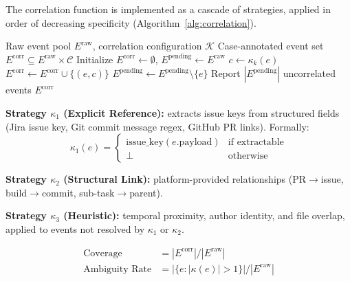 The correlation function is implemented as a cascade of strategies, applied
in order of decreasing specificity (Algorithm~\ref{alg:correlation}).

\begin{algorithm}[htbp]
\caption{Case Correlation Cascade}
\label{alg:correlation}
\begin{algorithmic}[1]
\REQUIRE Raw event pool $E^{\text{raw}}$, correlation configuration $\mathcal{K}$
\ENSURE Case-annotated event set $E^{\text{corr}} \subseteq E^{\text{raw}} \times \mathcal{C}$
\STATE Initialize $E^{\text{corr}} \gets \emptyset$, $E^{\text{pending}} \gets E^{\text{raw}}$
        \STATE $c \gets \kappa_k(e)$
            \STATE $E^{\text{corr}} \gets E^{\text{corr}} \cup \{(e, c)\}$
            \STATE $E^{\text{pending}} \gets E^{\text{pending}} \setminus \{e\}$
        \ENDIF
    \ENDFOR
\ENDFOR
\STATE Report $|E^{\text{pending}}|$ uncorrelated events
\RETURN $E^{\text{corr}}$
\end{algorithmic}
\end{algorithm}

\textbf{Strategy $\kappa_1$ (Explicit Reference):} extracts issue keys from
structured fields (Jira issue key, Git commit message regex, GitHub PR
links). Formally:
\begin{equation}
\label{eq:kappa1}
\kappa_1(e) = \begin{cases}
    \text{issue\_key}(e.\text{payload}) & \text{if extractable} \\
    \bot & \text{otherwise}
\end{cases}
\end{equation}

\textbf{Strategy $\kappa_2$ (Structural Link):} platform-provided
relationships (PR$\to$issue, build$\to$commit, sub-task$\to$parent).

\textbf{Strategy $\kappa_3$ (Heuristic):} temporal proximity, author
identity, and file overlap, applied to events not resolved by $\kappa_1$
or $\kappa_2$.

\begin{definition}
\label{def:corr-quality}
\begin{align}
\text{Coverage}      &= |E^{\text{corr}}| / |E^{\text{raw}}|
    \label{eq:corr-coverage} \\
\text{Ambiguity Rate} &= |\{e : |\kappa(e)| > 1\}| / |E^{\text{raw}}|
    \label{eq:corr-ambiguity}
\end{align}
\end{definition}


